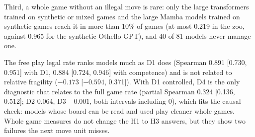 \documentclass[journal]{IEEEtran}
\begin{document}
Third, a whole game without an illegal move is rare: only the large transformers trained on synthetic or mixed games
and the large Mamba models trained on synthetic games reach it in more than 10\% of games (at most 0.219 in the zoo,
against 0.965 for the synthetic Othello GPT), and 40 of 81 models never manage one.

The free play legal rate ranks models much as D1 does (Spearman 0.891 [0.730, 0.951] with D1, 0.884 [0.724, 0.946]
with competence) and is not related to relative fragility ($-0.173$ [$-0.594$, 0.371]). With D1 controlled, D4 is
the only diagnostic that relates to the full game rate (partial Spearman 0.324 [0.136, 0.512]; D2 0.064, D3
$-0.001$, both intervals including 0), which fits the causal check: models whose board can be read and used play
cleaner whole games. Whole game measures do not change the H1 to H3 answers, but they show two failures the next
move unit misses.
\end{document}
